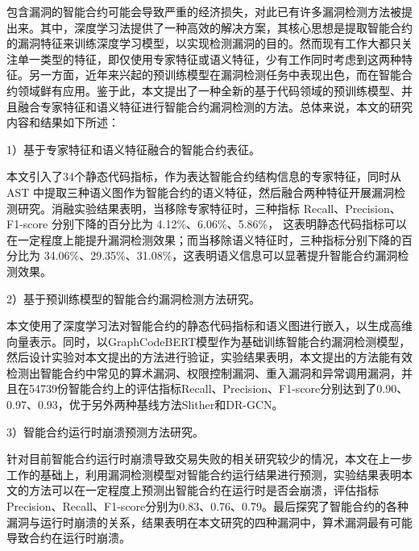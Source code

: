 \cleardoublepage
{}
包含漏洞的智能合约可能会导致严重的经济损失，对此已有许多漏洞检测方法被提出来。其中，深度学习法提供了一种高效的解决方案，其核心思想是提取智能合约的漏洞特征来训练深度学习模型，以实现检测漏洞的目的。然而现有工作大都只关注单一类型的特征，即仅使用专家特征或语义特征，少有工作同时考虑到这两种特征。另一方面，近年来兴起的预训练模型在漏洞检测任务中表现出色，而在智能合约领域鲜有应用。鉴于此，本文提出了一种全新的基于代码领域的预训练模型、并且融合专家特征和语义特征进行智能合约漏洞检测的方法。总体来说，本文的研究内容和结果如下所述：

    1）基于专家特征和语义特征融合的智能合约表征。

    本文引入了34个静态代码指标，作为表达智能合约结构信息的专家特征，同时从 AST 中提取三种语义图作为智能合约的语义特征，然后融合两种特征开展漏洞检测研究。消融实验结果表明，当移除专家特征时，三种指标 Recall、Precision、F1-score 分别下降的百分比为 4.12\%、6.06\%、5.86\%， 这表明静态代码指标可以在一定程度上能提升漏洞检测效果；而当移除语义特征时，三种指标分别下降的百分比为 34.06\%、29.35\%、31.08\%，这表明语义信息可以显著提升智能合约漏洞检测效果。

    2）基于预训练模型的智能合约漏洞检测方法研究。
    
    本文使用了深度学习法对智能合约的静态代码指标和语义图进行嵌入，以生成高维向量表示。同时，以GraphCodeBERT模型作为基础训练智能合约漏洞检测模型，然后设计实验对本文提出的方法进行验证，实验结果表明，本文提出的方法能有效检测出智能合约中常见的算术漏洞、权限控制漏洞、重入漏洞和异常调用漏洞，并且在\num{54739}份智能合约上的评估指标Recall、Precision、F1-score分别达到了0.90、0.97、0.93，优于另外两种基线方法Slither和DR-GCN。
    
    3）智能合约运行时崩溃预测方法研究。
    
    针对目前智能合约运行时崩溃导致交易失败的相关研究较少的情况，本文在上一步工作的基础上，利用漏洞检测模型对智能合约运行结果进行预测，实验结果表明本文的方法可以在一定程度上预测出智能合约在运行时是否会崩溃，评估指标Precision、Recall、F1-score分别为0.83、0.76、0.79。最后探究了智能合约的各种漏洞与运行时崩溃的关系，结果表明在本文研究的四种漏洞中，算术漏洞最有可能导致合约在运行时崩溃。



